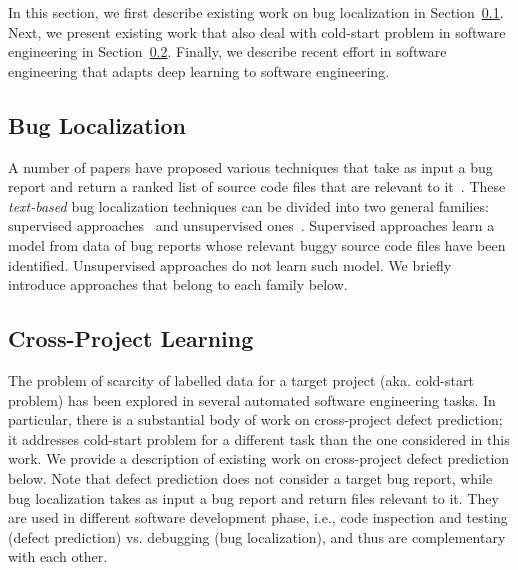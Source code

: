 In this section, we first describe existing work on bug localization in Section~\ref{sec.bugloc}. Next, we present existing work that also deal with cold-start problem in software engineering in Section~\ref{sec.crossproj}. Finally, we describe recent effort in software engineering that adapts deep learning to software engineering.

\subsection{Bug Localization}\label{sec.bugloc}


A number of papers have proposed various techniques that take as input a bug report and return a ranked list of source code files that are relevant to it~\cite{lukins2008source,RaoK11,SahaLKP14,rao2013incremental,huo2016learning}. These {\em text-based} bug localization techniques can be divided into two general families: supervised approaches~\cite{huo2016learning} and unsupervised ones~\cite{rao2013incremental}. Supervised approaches learn a model from data of bug reports whose relevant buggy source code files have been identified. Unsupervised approaches do not learn such model. We briefly introduce approaches that belong to each family below.

\vspace{0.2cm}

\vspace{0.2cm}

\subsection{Cross-Project Learning}\label{sec.crossproj}

The problem of scarcity of labelled data for a target project (aka. cold-start problem) has been explored in several automated software engineering tasks. In particular, there is a substantial body of work on cross-project defect prediction; it addresses cold-start problem for a different task than the one considered in this work. We provide a description of existing work on cross-project defect prediction below. Note that defect prediction does not consider a target bug report, while bug localization takes as input a bug report and return files relevant to it. They are used in different software development phase, i.e., code inspection and testing (defect prediction) vs. debugging (bug localization), and thus are complementary with each other.

